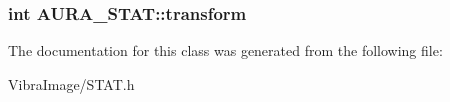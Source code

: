 \hypertarget{class_a_u_r_a___s_t_a_t_ad8264a616ff0f5313b67912a3b2f2ce4}{
\subsubsection[{transform}]{\setlength{\rightskip}{0pt plus 5cm}int A\+U\+R\+A\+\_\+\+S\+T\+A\+T\+::transform}}\label{class_a_u_r_a___s_t_a_t_ad8264a616ff0f5313b67912a3b2f2ce4}






The documentation for this class was generated from the following file\+:\begin{DoxyCompactItemize}
\item 
Vibra\+Image/S\+T\+A\+T.\+h\end{DoxyCompactItemize}
